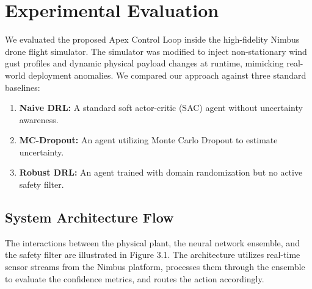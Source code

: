 \section{Experimental Evaluation}

We evaluated the proposed Apex Control Loop inside the high-fidelity Nimbus drone flight simulator. The simulator was modified to inject non-stationary wind gust profiles and dynamic physical payload changes at runtime, mimicking real-world deployment anomalies. We compared our approach against three standard baselines:
\begin{enumerate}
    \item \textbf{Naive DRL:} A standard soft actor-critic (SAC) agent without uncertainty awareness.
    \item \textbf{MC-Dropout:} An agent utilizing Monte Carlo Dropout to estimate uncertainty.
    \item \textbf{Robust DRL:} An agent trained with domain randomization but no active safety filter.
\end{enumerate}

\subsection{System Architecture Flow}

The interactions between the physical plant, the neural network ensemble, and the safety filter are illustrated in Figure 3.1. The architecture utilizes real-time sensor streams from the Nimbus platform, processes them through the ensemble to evaluate the confidence metrics, and routes the action accordingly.

